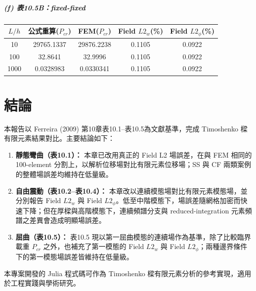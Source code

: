 ﻿\documentclass[UTF8, a4paper, 12pt]{ctexart}
\begin{document}
\subparagraph{(f) 表10.5B：fixed-fixed}

\begin{center}
\begin{tabular}{ccccc}
\toprule
\textbf{$L/h$} & \textbf{公式重算($P_{cr}$)} & \textbf{FEM($P_{cr}$)} & \textbf{Field $L2_w$(\%)} & \textbf{Field $L2_\phi$(\%)} \\
\midrule
10   & 29765.1337 & 29876.2238 & 0.1105 & 0.0922 \\
100  & 32.8641    & 32.9996    & 0.1105 & 0.0922 \\
1000 & 0.0328983  & 0.0330341  & 0.1105 & 0.0922 \\
\bottomrule
\end{tabular}
\end{center}

\section{結論}

本報告以 Ferreira (2009) 第10章表10.1--表10.5為文獻基準，完成 Timoshenko 樑有限元素結果對比。主要結論如下：

\begin{enumerate}
  \item \textbf{靜態彎曲（表10.1）：} 本章已改用真正的 Field L2 場誤差，在與 FEM 相同的 100-element 分割上，以解析位移場對比有限元素位移場；SS 與 CF 兩類案例的整體場誤差均維持在低量級。

  \item \textbf{自由震動（表10.2--表10.4）：} 本章改以連續模態場對比有限元素模態場，並分別報告 Field $L2_w$ 與 Field $L2_\phi$。低至中階模態下，場誤差隨網格加密而快速下降；但在厚樑與高階模態下，連續頻譜分支與 reduced-integration 元素頻譜之差異會造成明顯場誤差。

  \item \textbf{屈曲（表10.5）：} 表10.5 現以第一屈曲模態的連續場作為基準，除了比較臨界載重 $P_{cr}$ 之外，也補充了第一模態的 Field $L2_w$ 與 Field $L2_\phi$；兩種邊界條件下的第一模態場誤差皆維持在低量級。
\end{enumerate}

本專案開發的 Julia 程式碼可作為 Timoshenko 樑有限元素分析的參考實現，適用於工程實踐與學術研究。
\end{document}
